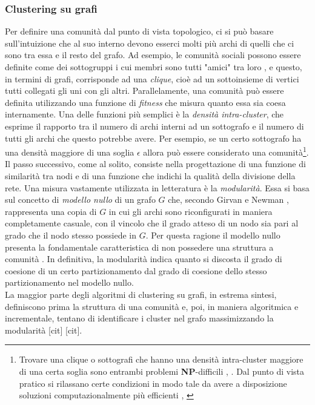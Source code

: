 \subsubsection{Clustering su grafi}
Per definire una comunit\`a dal punto di vista topologico, ci si pu\`o basare sull'intuizione che al suo interno devono esserci molti pi\`u archi di quelli che ci sono tra essa e il resto del grafo. Ad esempio, le comunit\`a sociali possono essere definite come dei sottogruppi i cui membri sono tutti "amici" tra loro \cite{Luce1949}, e questo, in termini di grafi, corrisponde ad una \textit{clique}, cio\`e ad un sottoinsieme di vertici tutti collegati gli uni con gli altri. Parallelamente, una comunit\`a pu\`o essere definita utilizzando una funzione di \textit{fitness} che misura quanto essa sia coesa internamente. Una delle funzioni pi\`u semplici \`e la \textit{densit\`a intra-cluster}, che esprime il rapporto tra il numero di archi interni ad un sottografo e il numero di tutti gli archi che questo potrebbe avere. Per esempio, se un certo sottografo ha una densit\`a maggiore di una soglia $ \epsilon $ allora pu\`o essere considerato una comunit\`a\footnote{Trovare una clique o sottografi che hanno una densit\`a intra-cluster maggiore di una certa soglia sono entrambi problemi \textbf{NP}-difficili \cite{Bomze99}, \cite{Garey1990}. Dal punto di vista pratico si rilassano certe condizioni in modo tale da avere a disposizione soluzioni computazionalmente pi\`u efficienti \cite{Alba73}, \cite{Asahiro2002}}. 
Il passo successivo, come al solito, consiste nella progettazione di una funzione di similarit\`a tra nodi e di una funzione che indichi la qualit\`a della divisione della rete. Una misura vastamente utilizzata in letteratura \`e la \textit{modularit\`a}. Essa si basa sul concetto di \textit{modello nullo} di un grafo $ G $ che, secondo Girvan e Newman \cite{NewGir04}, rappresenta una copia di $ G $ in cui gli archi sono riconfigurati in maniera completamente casuale, con il vincolo che il grado atteso di un nodo sia pari al grado che il nodo stesso possiede in $ G $. Per questa ragione il modello nullo presenta la fondamentale caratteristica di non possedere una struttura a comunit\`a \cite{Fortunato2010}. In definitiva, la modularit\`a indica quanto si discosta il grado di coesione di un certo partizionamento dal grado di coesione dello stesso partizionamento nel modello nullo.\\
La maggior parte degli algoritmi di clustering su grafi, in estrema sintesi, definiscono prima la struttura di una comunit\`a e, poi, in maniera algoritmica e incrementale, tentano di identificare i cluster nel grafo massimizzando la modularit\`a \cite{blondel2008fuc} [cit] [cit].

